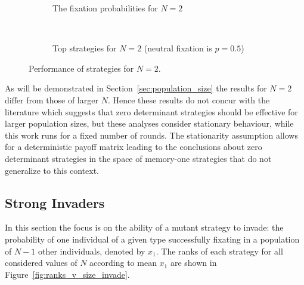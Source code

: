 \documentclass[10pt,journal]{IEEEtran}
\begin{document}
\begin{figure}[!hbtp]
\begin{subfigure}{.5\columnwidth}
        \caption{The fixation probabilities for \(N=2\)}
        \label{fig:boxplot_2}
    \end{subfigure}%
    ~
    \begin{subfigure}{.5\columnwidth}
        \scriptsize
        \centering
        \scalebox{0.95}{}
        \caption{Top strategies for \(N=2\) (neutral fixation is \(p=0.5\))}
        \label{tbl:summary_top_2}
    \end{subfigure}
    \caption{Performance of strategies for \(N=2\).}
\end{figure}

As will be demonstrated in Section~\ref{sec:population_size} the results for
\(N=2\) differ from those of larger $N$. Hence these results do not concur with
the literature which suggests that zero determinant strategies should be
effective for larger population sizes, but these analyses consider stationary
behaviour, while this work runs for a fixed number of rounds. \cite{stewart2013extortion}
The stationarity assumption allows for a deterministic payoff matrix
leading to the conclusions about zero determinant strategies in the space
of memory-one strategies that do not generalize to this context.


\subsection{Strong Invaders}\label{sec:strong_invaders}

In this section the focus is on the ability of a mutant strategy to invade: the
probability of one individual of a given type successfully fixating in a
population of \(N - 1\) other individuals, denoted by \(x_1\).
The ranks of each strategy for all considered values of \(N\) according to mean
\(x_1\) are shown in Figure~\ref{fig:ranks_v_size_invade}.
\end{document}
